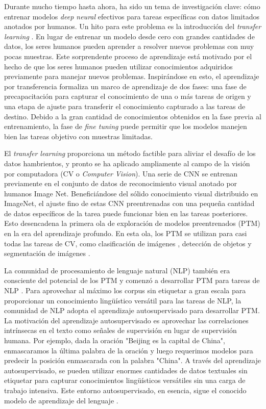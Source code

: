 Durante mucho tiempo hasta ahora, ha sido un tema de investigación clave: cómo entrenar modelos \textit{deep neural} efectivos para tareas específicas con datos limitados anotados por humanos. Un hito para este problema es la introducción del \textit{transfer learning} \parencite{76} \parencite{77}. En lugar de entrenar un modelo desde cero con grandes cantidades de datos, los seres humanos pueden aprender a resolver nuevos problemas con muy pocas muestras. Este sorprendente proceso de aprendizaje está motivado por el hecho de que los seres humanos pueden utilizar conocimientos adquiridos previamente para manejar nuevos problemas. Inspirándose en esto, el aprendizaje por transferencia formaliza un marco de aprendizaje de dos fases: una fase de precapacitación para capturar el conocimiento de una o más tareas de origen y una etapa de ajuste para transferir el conocimiento capturado a las tareas de destino. Debido a la gran cantidad de conocimientos obtenidos en la fase previa al entrenamiento, la fase de \textit{fine tuning} puede permitir que los modelos manejen bien las tareas objetivo con muestras limitadas.  

El \textit{transfer learning} proporciona un método factible para aliviar el desafío de los datos hambrientos, y pronto se ha aplicado ampliamente al campo de la visión por computadora (CV o \textit{Computer Vision}). Una serie de CNN \parencite{78} \parencite{79} \parencite{80} se entrenan previamente en el conjunto de datos de reconocimiento visual anotado por humanos Image Net. Beneficiándose del sólido conocimiento visual distribuido en ImageNet, el ajuste fino de estas CNN preentrenadas con una pequeña cantidad de datos específicos de la tarea puede funcionar bien en las tareas posteriores. Esto desencadena la primera ola de exploración de modelos preentrenados (PTM) en la era del aprendizaje profundo. En esta ola, los PTM se utilizan para casi todas las tareas de CV, como clasificación de imágenes \parencite{81}, detección de objetos \parencite{82} y segmentación de imágenes \parencite{83}.  

La comunidad de procesamiento de lenguaje natural (NLP) también era consciente del potencial de los PTM y comenzó a desarrollar PTM para tareas de NLP \parencite{84}. Para aprovechar al máximo los corpus sin etiquetar a gran escala para proporcionar un conocimiento lingüístico versátil para las tareas de NLP, la comunidad de NLP adopta el aprendizaje autosupervisado \parencite{85} para desarrollar PTM. La motivación del aprendizaje autosupervisado es aprovechar las correlaciones intrínsecas en el texto como señales de supervisión en lugar de supervisión humana. Por ejemplo, dada la oración "Beijing es la capital de China", enmascaramos la última palabra de la oración y luego requerimos modelos para predecir la posición enmascarada con la palabra "China". A través del aprendizaje autosupervisado, se pueden utilizar enormes cantidades de datos textuales sin etiquetar para capturar conocimientos lingüísticos versátiles sin una carga de trabajo intensiva. Este entorno autosupervisado, en esencia, sigue el conocido modelo de aprendizaje del lenguaje \parencite{86}.  

